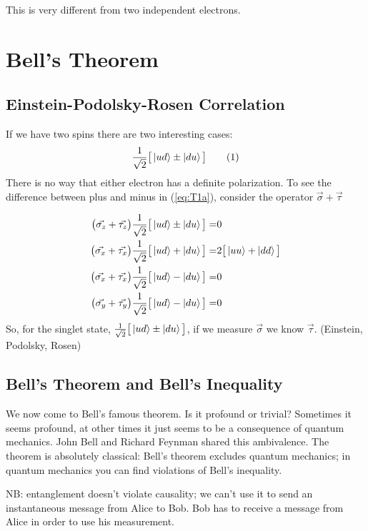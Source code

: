 \documentclass[]{article}
\newcommand\numberthis{\addtocounter{equation}{1}\tag{\theequation}}
\begin{document}
This is very different from two independent electrons.

\section{Bell's Theorem}

\subsection{Einstein-Podolsky-Rosen Correlation}

If we have two spins there are two interesting cases:
\begin{align*}
	\frac{1}{\sqrt{2}}\big[\ket{ud}\pm\ket{du}\big] \numberthis \label{eq:T1a}
\end{align*}
There is no way that either electron has a definite polarization. To see the difference between plus and minus in (\ref{eq:T1a}), consider the operator $\vec{\sigma} + \vec{\tau}$

\begin{align*}
	\big(\vec{\sigma_z} + \vec{\tau_z}\big)\frac{1}{\sqrt{2}}\big[\ket{ud}\pm\ket{du}\big]=& 0\\
	\big(\vec{\sigma_x} + \vec{\tau_x}\big)\frac{1}{\sqrt{2}}\big[\ket{ud}+\ket{du}\big]=& 2 \big[\ket{uu}+\ket{dd}\big]\\
	\big(\vec{\sigma_x} + \vec{\tau_x}\big)\frac{1}{\sqrt{2}}\big[\ket{ud}-\ket{du}\big]=& 0\\
	\big(\vec{\sigma_y} + \vec{\tau_y}\big)\frac{1}{\sqrt{2}}\big[\ket{ud}-\ket{du}\big]=& 0
\end{align*}
So, for the singlet state, $\frac{1}{\sqrt{2}}\big[\ket{ud}\pm\ket{du}\big]$, if we measure $\vec{\sigma}$ we know $\vec{\tau}$. (Einstein, Podolsky, Rosen)\cite{einstein1935can}

\subsection{Bell's Theorem and Bell's Inequality}\label{sec:bell}

We now come to Bell's famous theorem\cite{bell1964einstein}. Is it profound or trivial? Sometimes it seems profound, at other times it just seems to be a consequence of quantum mechanics. John Bell and Richard Feynman shared this ambivalence. The theorem is absolutely classical:  Bell's theorem excludes quantum mechanics; in quantum mechanics you can find violations of Bell's inequality.

NB: entanglement doesn't violate causality; we can't use it to send an instantaneous message from Alice to Bob. Bob has to receive a message from Alice in order to use his measurement.
\end{document}
